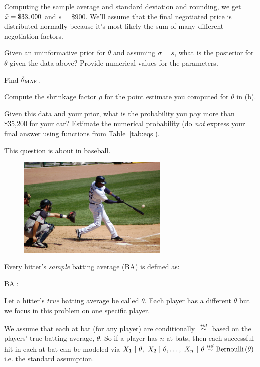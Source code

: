 \documentclass[12pt]{article}
\begin{document}
\noindent Computing the sample average and standard deviation and rounding, we get $\bar{x} = \$33,000$ and $s = \$900$. We'll assume that the final negotiated price is distributed normally because it's most likely the sum of many different negotiation factors.

\benum

 Given an uninformative prior for $\theta$ and assuming $\sigma = s$, what is the posterior for $\theta$ given the data above? Provide numerical values for the parameters. 

 Find $\hat{\theta}_{\mathrm{MAE}}$. 

 Compute the shrinkage factor $\rho$ for the point estimate you computed for $\theta$ in (b). 

 Given this data and your prior, what is the probability you pay more than \$35,200 for your car? Estimate the numerical probability (do \textit{not} express your final answer using functions from Table~\ref{tab:eqs}). 

\eenum



\problem This question is about  in baseball.

\begin{figure}[htp]
\centering
\includegraphics[width=2.8in]{baseball.jpg}
\end{figure}

\noindent Every hitter's \emph{sample} batting average (BA) is defined as:

\beqn
BA := 
\eeqn

Let a hitter's \emph{true} batting average be called $\theta$. Each player has a different $\theta$ but we focus in this problem on one specific player. 

We assume that each at bat (for any player) are conditionally $\iid$ based on the players' true batting average, $\theta$. So if a player has $n$ at bats, then each successful hit in each at bat can be modeled via $X_1~|~\theta, ~X_2~|~\theta, \ldots, ~X_n~|~\theta \iid \bernoulli{\theta}$ i.e. the standard assumption.
\end{document}
